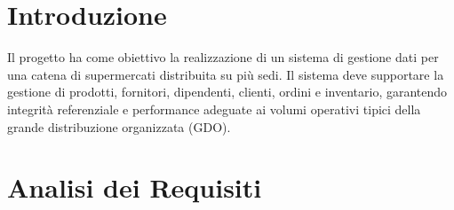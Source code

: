 \documentclass[12pt, a4paper, twoside, openright]{article}
\begin{document}
\dominitoc  %



\begin{abstract}
\noindent
Il presente progetto affronta la progettazione e l'implementazione di un database relazionale
per la gestione di una catena di supermercati (\textit{SuperMarket Chain}).
L'elaborato descrive l'analisi dei requisiti, la progettazione concettuale tramite schema E/R,
la traduzione al modello relazionale, la normalizzazione e l'implementazione fisica in PostgreSQL.
Vengono inoltre presentate le principali query SQL per l'interrogazione e la gestione dei dati,
corredati di pseudocodice per gli algoritmi applicativi rilevanti.
\end{abstract}

\newpage

\tableofcontents
\newpage

\listoffigures
\listoftables
\newpage

\section*{Introduzione}

Il progetto ha come obiettivo la realizzazione di un sistema di gestione dati per una catena
di supermercati distribuita su più sedi. Il sistema deve supportare la gestione di prodotti,
fornitori, dipendenti, clienti, ordini e inventario, garantendo integrità referenziale
e performance adeguate ai volumi operativi tipici della grande distribuzione organizzata (GDO).

\newpage

\section{Analisi dei Requisiti}
\minitoc
\vspace{1cm}
\end{document}
